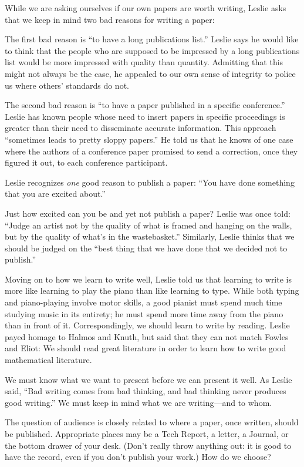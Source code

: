 While we are asking ourselves if our own papers are worth writing, Leslie
asks that we keep in mind two bad reasons for writing a paper:

The first bad reason is ``to have a long publications list.''  Leslie says
he would like to think that the people who are supposed to be impressed by
a long publications list would be more impressed with quality than
quantity. Admitting that this might not always be the case, he appealed to
our own sense of integrity to police us where others' standards do not. 

The second bad reason is ``to have a paper published in a specific
conference.''  Leslie has known people whose need to insert papers in
specific proceedings is greater than their need to disseminate accurate
information.  This approach ``sometimes leads to pretty sloppy papers.''
He told us that he knows of one case where the authors of a conference
paper promised to send a correction, once they figured it out, to each
conference participant.

Leslie recognizes {\it one\/} good reason to publish a paper: ``You have done
something that you are excited about.''

Just how excited can you be and yet not publish a paper? Leslie was once
told: ``Judge an artist not by the quality of what is framed and hanging on
the walls, but by the quality of what's in the wastebasket.'' Similarly,
Leslie thinks that we should be judged on the ``best thing that we have
done that we decided not to publish.''

Moving on to how we learn to write well, Leslie told us that learning to
write is more like learning to play the piano than like learning to type.
While both typing and piano-playing involve motor skills, a good pianist
must spend much time studying music in its entirety; he must spend more
time away from the piano than in front of it.  Correspondingly, we should
learn to write by reading.  Leslie payed homage to Halmos and Knuth, but
said that they can not match Fowles and Eliot: We should read great
literature in order to learn how to write good mathematical literature.

We must know what we want to present before we can present it well.
As Leslie said, ``Bad writing comes from bad thinking, and bad thinking
never produces good writing.'' We must keep in mind what we are
writing---and to whom.

The question of audience is closely related to where a paper, once
written, should be published.  Appropriate places may be a Tech
Report, a letter, a Journal, or the bottom drawer of your desk. (Don't
really throw anything out: it is good to have the record, even if you don't
publish your work.)  How do we choose?

